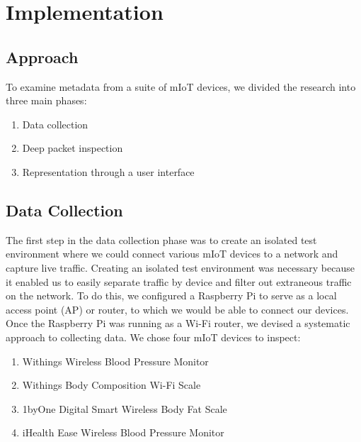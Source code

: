 \section{Implementation}

\subsection{Approach}

To examine metadata from a suite of mIoT devices, we divided the research into three main phases: 

\begin{enumerate}
  \item Data collection
  \item Deep packet inspection
  \item Representation through a user interface
\end{enumerate}

\subsection{Data Collection}

The first step in the data collection phase was to create an isolated test environment where we could connect various mIoT devices to a network and capture live traffic. Creating an isolated test environment was necessary because it enabled us to easily separate traffic by device and filter out extraneous traffic on the network. To do this, we configured a Raspberry Pi to serve as a local access point (AP) or router, to which we would be able to connect our devices. Once the Raspberry Pi was running as a Wi-Fi router, we devised a systematic approach to collecting data. We chose four mIoT devices to inspect:

\begin{enumerate}
  \item Withings Wireless Blood Pressure Monitor
  \item Withings Body Composition Wi-Fi Scale
  \item 1byOne Digital Smart Wireless Body Fat Scale
  \item iHealth Ease Wireless Blood Pressure Monitor
\end{enumerate}

